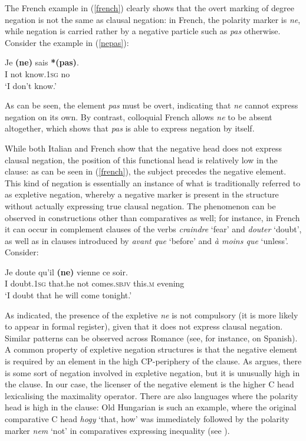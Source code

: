 The French example in (\ref{french}) clearly shows that the overt marking of degree negation is not the same as clausal negation: in French, the polarity marker is \textit{ne}, while negation is carried rather by a negative particle such as \textit{pas} otherwise. Consider the example in (\ref{nepas}):

\ea \gll Je \textbf{(ne)} sais \textbf{*(pas)}. \label{nepas}\\
I \phantom{\textbf{(}}not know.\textsc{1sg} \phantom{\textbf{*(}}no\\
\glt `I don't know.'
\z

As can be seen, the element \textit{pas} must be overt, indicating that \textit{ne} cannot express negation on its own. By contrast, colloquial French allows \textit{ne} to be absent altogether, which shows that \textit{pas} is able to express negation by itself.

While both Italian and French show that the negative head does not express clausal negation, the position of this functional head is relatively low in the clause: as can be seen in (\ref{french}), the subject precedes the negative element. This kind of negation is essentially an instance of what is traditionally referred to as expletive negation, whereby a negative marker is present in the structure without actually expressing true clausal negation. The phenomenon can be observed in constructions other than comparatives as well; for instance, in French it can occur in complement clauses of the verbs \textit{craindre} `fear' and \textit{douter} `doubt', as well as in clauses introduced by \textit{avant que} `before' and \textit{\`{a} moins que} `unless'. Consider:

\ea \gll Je doute qu'il \textbf{(ne)} vienne ce soir.\\
I doubt.\textsc{1sg} that.he \phantom{\textbf{(}}not comes.\textsc{sbjv} this.\textsc{m} evening\\
\glt `I doubt that he will come tonight.'
\z

As indicated, the presence of the expletive \textit{ne} is not compulsory (it is more likely to appear in formal register), given that it does not express clausal negation. Similar patterns can be observed across Romance (see, for instance, \citealt{espinal2000} on Spanish). A common property of expletive negation structures is that the negative element is required by an element in the high CP-periphery of the clause. As \citet{abels2005} argues, there is some sort of negation involved in expletive negation, but it is unusually high in the clause. In our case, the licenser of the negative element is the higher C head lexicalising the maximality operator. There are also languages where the polarity head is high in the clause: Old Hungarian is such an example, where the original comparative C head \textit{hogy} `that, how' was immediately followed by the polarity marker \textit{nem} `not' in comparatives expressing inequality (see \citealt{bacskaiatkari2014dia, bacskaiatkari2014diss, bacskaiatkari2016alh}).

